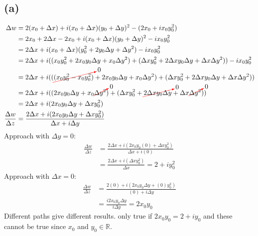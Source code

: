 \documentclass{article}
\newcommand{\canceling}[2]{\textcolor{red}{\cancelto{\textcolor{black}{#1}}{\textcolor{black}{#2}}}}
\begin{document}
\subsection*{(a)}
\begin{align*}
  \Delta w &=  2(x_0+\Delta x)+i(x_0+\Delta x)(y_0+\Delta y)^2 - (2x_0+ix_0y_0^2)\\
           &= 2x_0+2\Delta x - 2x_0 + i(x_0+\Delta x)(y_0+\Delta y)^2 - ix_0y_0^2 \\
           &= 2\Delta x+ i(x_0+\Delta x)(y_0^2+2y_0\Delta y + \Delta y ^2)- ix_0y_0^2\\
           &= 2\Delta x+ i((x_0y_0^2+2x_0y_0\Delta y + x_0\Delta y ^2)+(\Delta xy_0^2+2\Delta xy_0\Delta y + \Delta x\Delta y ^2))- ix_0y_0^2\\
           &= 2\Delta x+ i((\canceling{0}{(x_0y_0^2- x_0y_0^2)}+2x_0y_0\Delta y + x_0\Delta y ^2)+(\Delta xy_0^2+2\Delta xy_0\Delta y + \Delta x\Delta y ^2))\\  
           &= 2\Delta x+ i((2x_0y_0\Delta y + x_0\canceling{0}{\Delta y ^2})+(\Delta xy_0^2+\canceling{0}{2\Delta xy_0\Delta y} + \Delta x\canceling{0}{\Delta y ^2}))\\
           &= 2\Delta x+ i(2x_0y_0\Delta y +\Delta xy_0^2)\\
  \frac{\Delta w}{\Delta z} &= \frac{2\Delta x+ i(2x_0y_0\Delta y +\Delta xy_0^2)}{\Delta x + i\Delta y}
\end{align*}
Approach with $\Delta y = 0$:
\begin{align*}
  \frac{\Delta w}{\Delta z} &= \frac{2\Delta x+ i(2x_0y_0(0) +\Delta xy_0^2)}{\Delta x + i(0)}\\
  &= \frac{2\Delta x+ i(\Delta xy_0^2)}{\Delta x} = 2+iy_0^2
\end{align*}
Approach with $\Delta x = 0$:
\begin{align*}
  \frac{\Delta w}{\Delta z} &= \frac{2(0)+ i(2x_0y_0\Delta y +(0)y_0^2)}{(0) + i\Delta y} \\
  &= \frac{i2x_0y_0\Delta y}{i\Delta y} = 2x_0y_0
\end{align*}
Different paths give different results. only true if $2x_0y_0 = 2+iy_0$ and these cannot be true since $x_0 $ and $y_0 \in \mathbb{R}$.
\newpage
\end{document}
